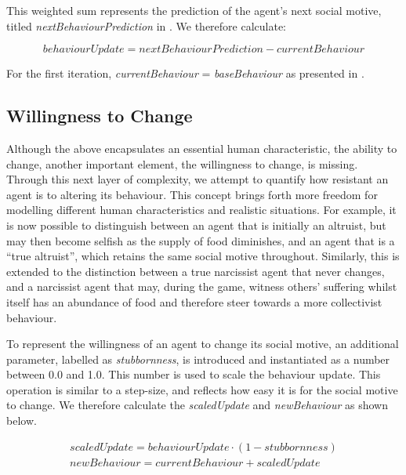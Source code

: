 This weighted sum represents the prediction of the agent's next social motive, titled \textit{nextBehaviourPrediction} in . We therefore calculate:

\begin{equation}
    \mathit{behaviourUpdate = nextBehaviourPrediction - currentBehaviour}
\end{equation}


For the first iteration, \textit{currentBehaviour} = \textit{baseBehaviour} as presented in .

\subsection{Willingness to Change}
Although the above encapsulates an essential human characteristic, the ability to change, another important element, the willingness to change, is missing. Through this next layer of complexity, we attempt to quantify how resistant an agent is to altering its behaviour. This concept brings forth more freedom for modelling different human characteristics and realistic situations. For example, it is now possible to distinguish between an agent that is initially an altruist, but may then become selfish as the supply of food diminishes, and an agent that is a “true altruist”, which retains the same social motive throughout. Similarly, this is extended to the distinction between a true narcissist agent that never changes, and a narcissist agent that may, during the game, witness others' suffering whilst itself has an abundance of food and therefore steer towards a more collectivist behaviour.

To represent the willingness of an agent to change its social motive, an additional parameter, labelled as \textit{stubbornness}, is introduced and instantiated as a number between 0.0 and 1.0. This number is used to scale the behaviour update. This operation is similar to a step-size, and reflects how easy it is for the social motive to change. We therefore calculate the \textit{scaledUpdate} and \textit{newBehaviour} as shown below.


\begin{equation}
    \begin{gathered}
    \mathit{scaledUpdate = behaviourUpdate \cdot (1-stubbornness)} \\
    \mathit{newBehaviour = currentBehaviour + scaledUpdate}
    \end{gathered}
\end{equation}


